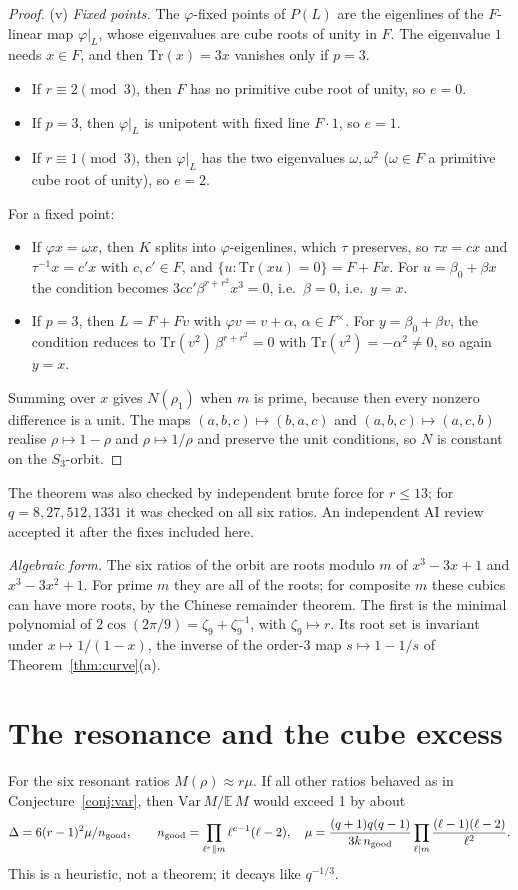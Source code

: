 \begin{proof}
(v) \emph{Fixed points.} The $\varphi$-fixed points of $P(L)$ are the eigenlines of the $F$-linear map $\varphi|_L$, whose eigenvalues are cube roots of unity in $F$.
The eigenvalue $1$ needs $x\in F$, and then $\mathrm{Tr}(x)=3x$ vanishes only if $p=3$.
\begin{itemize}
\item If $r\equiv2\pmod3$, then $F$ has no primitive cube root of unity, so $e=0$.
\item If $p=3$, then $\varphi|_L$ is unipotent with fixed line $F\cdot1$, so $e=1$.
\item If $r\equiv1\pmod3$, then $\varphi|_L$ has the two eigenvalues $\omega,\omega^2$ ($\omega\in F$ a primitive cube root of unity), so $e=2$.
\end{itemize}
For a fixed point:
\begin{itemize}
\item If $\varphi x=\omega x$, then $K$ splits into $\varphi$-eigenlines, which $\tau$ preserves, so $\tau x=cx$ and $\tau^{-1}x=c'x$ with $c,c'\in F$, and $\{u:\mathrm{Tr}(xu)=0\}=F+Fx$.
For $u=\beta_0+\beta x$ the condition becomes $3cc'\beta^{r+r^2}x^3=0$, i.e.\ $\beta=0$, i.e.\ $y=x$.
\item If $p=3$, then $L=F+Fv$ with $\varphi v=v+\alpha$, $\alpha\in F^\times$. For $y=\beta_0+\beta v$, the condition reduces to $\mathrm{Tr}(v^2)\,\beta^{r+r^2}=0$ with $\mathrm{Tr}(v^2)=-\alpha^2\ne0$, so again $y=x$.
\end{itemize}
Summing over $x$ gives $N(\rho_1)$ when $m$ is prime, because then every nonzero difference is a unit.
The maps $(a,b,c)\mapsto(b,a,c)$ and $(a,b,c)\mapsto(a,c,b)$ realise $\rho\mapsto1-\rho$ and $\rho\mapsto1/\rho$ and preserve the unit conditions, so $N$ is constant on the $S_3$-orbit.
\end{proof}
The theorem was also checked by independent brute force for $r\le13$; for $q=8,27,512,1331$ it was checked on all six ratios. An independent AI review accepted it after the fixes included here.

\emph{Algebraic form.} The six ratios of the orbit are roots modulo $m$ of $x^3-3x+1$ and $x^3-3x^2+1$. For prime $m$ they are all of the roots;
for composite $m$ these cubics can have more roots, by the Chinese remainder theorem. The first is the minimal polynomial of $2\cos(2\pi/9)=\zeta_9+\zeta_9^{-1}$, with $\zeta_9\mapsto r$.
Its root set is invariant under $x\mapsto1/(1-x)$, the inverse of the order-3 map $s\mapsto1-1/s$ of Theorem~\ref{thm:curve}(a).

\section{The resonance and the cube excess}\label{sec:resblind}
For the six resonant ratios $M(\rho)\approx r\mu$. If all other ratios behaved as in Conjecture~\ref{conj:var}, then $\mathrm{Var}\,M/\mathbb E\,M$ would exceed 1 by about
\[\Delta=6(r-1)^2\mu/n_{\rm good},\qquad n_{\rm good}=\prod_{\ell^e\|m}\ell^{e-1}(\ell-2),\quad \mu=\frac{(q+1)q(q-1)}{3k\,n_{\rm good}}\prod_{\ell\mid m}\frac{(\ell-1)(\ell-2)}{\ell^2}.\]
This is a heuristic, not a theorem; it decays like $q^{-1/3}$.

